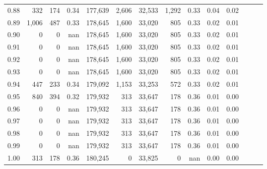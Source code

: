 \begin{tabular}{rrrrrrrrrrrrrr}
0.88 &     332 &    174 &  0.34 &  177,639 &    2,606 &  32,533 &   1,292 &  0.33 &  0.04 &      0.02 \\
0.89 &   1,006 &    487 &  0.33 &  178,645 &    1,600 &  33,020 &     805 &  0.33 &  0.02 &      0.01 \\
0.90 &       0 &      0 &   nan &  178,645 &    1,600 &  33,020 &     805 &  0.33 &  0.02 &      0.01 \\
0.91 &       0 &      0 &   nan &  178,645 &    1,600 &  33,020 &     805 &  0.33 &  0.02 &      0.01 \\
0.92 &       0 &      0 &   nan &  178,645 &    1,600 &  33,020 &     805 &  0.33 &  0.02 &      0.01 \\
0.93 &       0 &      0 &   nan &  178,645 &    1,600 &  33,020 &     805 &  0.33 &  0.02 &      0.01 \\
0.94 &     447 &    233 &  0.34 &  179,092 &    1,153 &  33,253 &     572 &  0.33 &  0.02 &      0.01 \\
0.95 &     840 &    394 &  0.32 &  179,932 &      313 &  33,647 &     178 &  0.36 &  0.01 &      0.00 \\
0.96 &       0 &      0 &   nan &  179,932 &      313 &  33,647 &     178 &  0.36 &  0.01 &      0.00 \\
0.97 &       0 &      0 &   nan &  179,932 &      313 &  33,647 &     178 &  0.36 &  0.01 &      0.00 \\
0.98 &       0 &      0 &   nan &  179,932 &      313 &  33,647 &     178 &  0.36 &  0.01 &      0.00 \\
0.99 &       0 &      0 &   nan &  179,932 &      313 &  33,647 &     178 &  0.36 &  0.01 &      0.00 \\
1.00 &     313 &    178 &  0.36 &  180,245 &        0 &  33,825 &       0 &   nan &  0.00 &      0.00 \\
\bottomrule
\end{tabular}
